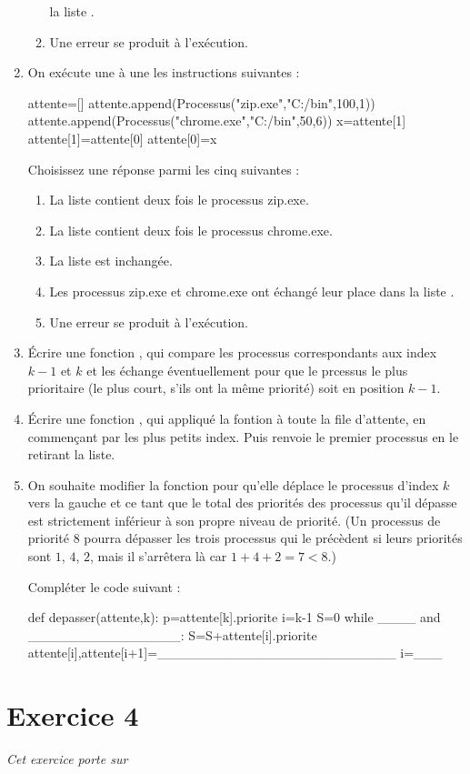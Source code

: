 \documentclass[11pt,a4paper,french,twoside]{PMCours}
\begin{document}
\begin{enumerate}
\begin{enumerate}
        la liste . 
        \item Une erreur se produit à l'exécution. 
    \end{enumerate}
    \item On exécute une à une les instructions suivantes :
\begin{Python}
attente=[]
attente.append(Processus("zip.exe","C:/bin",100,1))
attente.append(Processus("chrome.exe","C:/bin",50,6))
x=attente[1]
attente[1]=attente[0]
attente[0]=x
\end{Python}
    Choisissez une réponse parmi les cinq suivantes :
    \begin{enumerate}
        \item La liste  contient deux fois le processus zip.exe. 
        \item La liste  contient deux fois le processus chrome.exe. 
        \item La liste  est inchangée. 
        \item Les processus zip.exe et chrome.exe ont échangé leur place dans 
        la liste . 
        \item Une erreur se produit à l'exécution. 
    \end{enumerate}
    \item Écrire une fonction , qui compare les processus
    correspondants aux index $k-1$ et $k$ et les échange éventuellement pour que
    le prcessus le plus prioritaire (le plus court, s'ils ont la même priorité) 
    soit en position $k-1$.
    \item Écrire une fonction , qui appliqué la fontion 
     à toute la file d'attente, en commençant par les plus petits 
    index. Puis renvoie le premier processus en le retirant la liste.
    \item On souhaite modifier la fonction  pour qu'elle
    déplace le processus d'index $k$ vers la gauche et ce tant que le total des 
    priorités des processus qu'il dépasse est strictement inférieur 
    à son propre niveau de priorité. (Un processus de priorité $8$ pourra 
    dépasser les trois processus qui le précèdent si leurs priorités sont $1$, $4$, $2$, 
    mais il s'arrêtera là car $1+4+2=7<8$.)
    
    Compléter le code suivant :
\begin{Python}
def depasser(attente,k):
    p=attente[k].priorite
    i=k-1
    S=0
    while ____ and ________________:
        S=S+attente[i].priorite
        attente[i],attente[i+1]=_________________________
        i=___
\end{Python}
\end{enumerate}

\newpage\noindent

\section*{Exercice 4}
\emph{Cet exercice porte sur }\\
\end{document}
